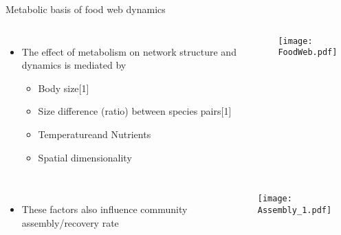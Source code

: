 \begin{frame}{Metabolic basis of food web dynamics}

\begin{columns}[c]
    \begin{itemize}\setlength{\itemindent}{0em} \itemsep4pt
      
    \item The effect of metabolism on network structure and dynamics is mediated by 
    \begin{itemize}\setlength{\itemindent}{-1em}
      \item Body size[1]
      \item Size difference (ratio) between species pairs[1]
      \item Temperature\footnotemark[1] and Nutrients
      \item Spatial dimensionality\footnotemark[1]
    \end{itemize} 

  \end{itemize}
    \texttt{[image: FoodWeb.pdf]}
\end{columns}
\pause
\begin{columns}[c]
    \begin{itemize}\setlength{\itemindent}{0em} \itemsep4pt
      
      \item These factors also influence community assembly/recovery rate
      
    \end{itemize}

  \texttt{[image: Assembly\_1.pdf]}
\end{columns}
\end{frame}


